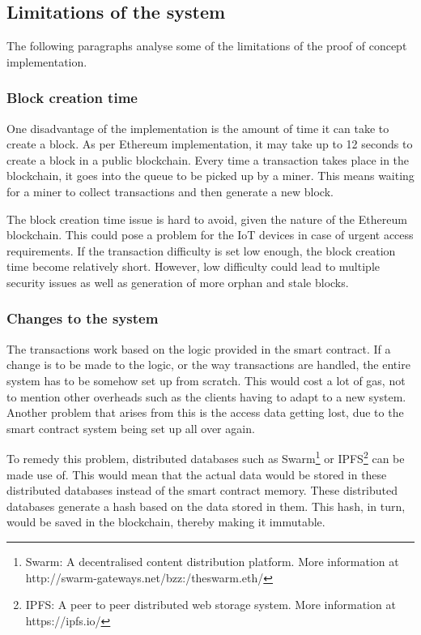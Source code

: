 \documentclass[english]{tktltiki}
\begin{document}
\subsection{Limitations of the system}
The following paragraphs analyse some of the limitations of the proof of concept implementation. 

\subsubsection{Block creation time}
One disadvantage of the implementation is the amount of time it can take to create a block. As per Ethereum implementation, it may take up to 12 seconds to create a block in a public blockchain. Every time a transaction takes place in the blockchain, it goes into the queue to be picked up by a miner. This means waiting for a miner to collect transactions and then generate a new block. 

The block creation time issue is hard to avoid, given the nature of the Ethereum blockchain. This could pose a problem for the IoT devices in case of urgent access requirements. If the transaction difficulty is set low enough, the block creation time become relatively short. However, low difficulty could lead to multiple security issues as well as generation of more orphan and stale blocks.

\subsubsection{Changes to the system}
The transactions work based on the logic provided in the smart contract. If a change is to be made to the logic, or the way transactions are handled, the entire system has to be somehow set up from scratch. This would cost a lot of gas, not to mention other overheads such as the clients having to adapt to a new system. Another problem that arises from this is the access data getting lost, due to the smart contract system being set up all over again. 

To remedy this problem, distributed databases such as Swarm\footnote{Swarm: A decentralised content distribution platform. More information at http://swarm-gateways.net/bzz:/theswarm.eth/} or IPFS\footnote{IPFS: A peer to peer distributed web storage system. More information at https://ipfs.io/} can be made use of. This would mean that the actual data would be stored in these distributed databases instead of the smart contract memory. These distributed databases generate a hash based on the data stored in them. This hash, in turn, would be saved in the blockchain, thereby making it immutable. 
\end{document}
